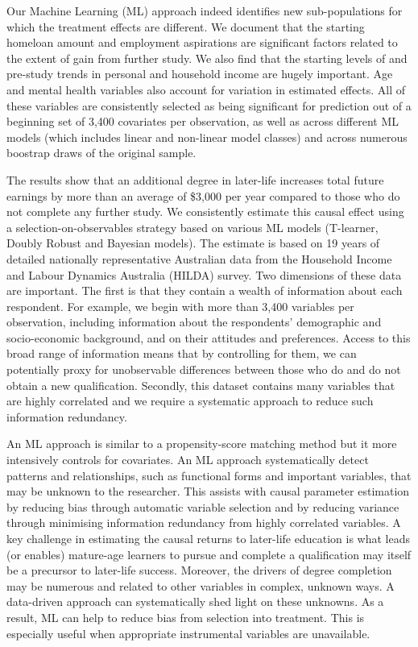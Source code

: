 \documentclass[12pt, a4paper]{article}
\begin{document}
Our Machine Learning (ML) approach indeed identifies new sub-populations for which the treatment effects are different. We document that the starting homeloan amount and employment aspirations are significant factors related to the extent of gain from further study. We also find that the starting levels of and pre-study trends in personal and household income are hugely important. Age and mental health variables also account for variation in estimated effects. All of these variables are consistently selected as being significant for prediction out of a beginning set of 3,400 covariates per observation, as well as across different ML models (which includes linear and non-linear model classes) and across numerous boostrap draws of the original sample.

The results show that an additional degree in later-life increases total future earnings by more than an average of \$3,000 per year compared to those who do not complete any further study. We consistently estimate this causal effect using a selection-on-observables strategy based on various ML models (T-learner, Doubly Robust and Bayesian models). The estimate is based on 19 years of detailed nationally representative Australian data from the Household Income and Labour Dynamics Australia (HILDA) survey. Two dimensions of these data are important. The first is that they contain a wealth of information about each respondent. For example, we begin with more than 3,400 variables per observation, including information about the respondents' demographic and socio-economic background, and on their attitudes and preferences. Access to this broad range of information means that by controlling for them, we can potentially proxy for unobservable differences between those who do and do not obtain a new qualification. Secondly, this dataset contains many variables that are highly correlated and we require a systematic approach to reduce such information redundancy.

An ML approach is similar to a propensity-score matching method but it more intensively controls for covariates. An ML approach systematically detect patterns and relationships, such as functional forms and important variables, that may be unknown to the researcher. This assists with causal parameter estimation by reducing bias through automatic variable selection and by reducing variance through minimising information redundancy from highly correlated variables. A key challenge in estimating the causal returns to later-life education is what leads (or enables) mature-age learners to pursue and complete a qualification may itself be a precursor to later-life success. Moreover, the drivers of degree completion may be numerous and related to other variables in complex, unknown ways. A data-driven approach can systematically shed light on these unknowns. As a result, ML can help to reduce bias from selection into treatment. This is especially useful when appropriate instrumental variables are unavailable.
\end{document}
